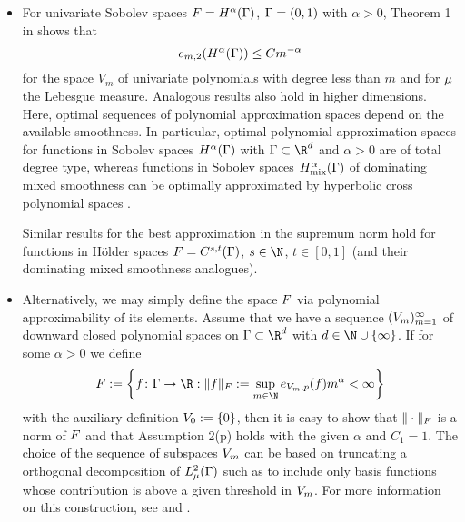 \begin{exa}
	\label{exa:polapp}
	\begin{itemize}\item 
For univariate Sobolev spaces $F=H^{\alpha}(\Gamma)$, $\Gamma=(0,1)$ with $\alpha>0$, Theorem 1 in \cite{quarteroni1984some} shows that
\begin{equation*}
e_{m,2}(H^{\alpha}(\Gamma))\leq C m^{-\alpha}
\end{equation*}
for the space $V_{m}$ of univariate polynomials with degree less than $m$ and for $\mu$ the Lebesgue measure.
Analogous results also hold in higher dimensions. Here, optimal sequences of polynomial approximation spaces depend on the available smoothness. In particular, optimal polynomial approximation spaces for functions in Sobolev spaces $H^\alpha(\Gamma)$ with $\domPS\subset\R^d$ and $\alpha>0$ are of total degree type, whereas functions in Sobolev spaces $H^{\alpha}_{\text{mix}}(\Gamma)$ of dominating mixed smoothness can be optimally approximated by hyperbolic cross polynomial spaces \cite{DuTeUl2015}.

	Similar results for the best approximation in the supremum norm hold for functions in Hölder spaces $F=C^{s,t}(\Gamma)$, $s\in\N$, $t\in[0,1]$ \cite[Theorem 2]{BagbyBosLevenberg2002} (and their dominating mixed smoothness analogues). 

\item 
Alternatively, we may simply define the space $F$ via polynomial approximability of its elements. Assume that we have a sequence $(V_m)_{m=1}^\infty$ of downward closed polynomial spaces on $\domPS\subset\R^\dps$ with $\dps\in\N\cup\{\infty\}$. If for some $\alpha>0$ we define
		\begin{equation*}
		\F:=\left\{ \rs\colon \domPS\to\R: \|\rs\|_{\F}:=\sup_{\dvsp\in\N} e_{\vsp_{\dvsp},p}(\rs)\dvsp^{\alpha}<\infty\right\}
		\end{equation*}
		with the auxiliary definition $V_0:=\{0\}$, then it is easy to show that $\|\cdot\|_{F}$ is a norm of $F$ and that Assumption 2(p) holds with the given $\alpha$ and $C_1=1$.  The choice of the sequence of subspaces $V_m$ can be based on truncating a orthogonal decomposition of $L^2_\mu(\Gamma)$ such as to include only basis functions whose contribution is above a given threshold in $V_m$.  For more information on this construction, see  and \cite{Haji-AliNobileTamelliniEtAl2015a,devore1998nonlinear}.
\end{itemize}
\end{exa}


